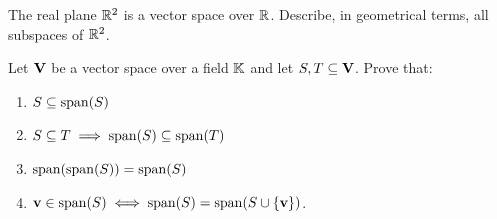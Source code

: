 \begin{exercise}
The real plane $\R^2$ is a vector space over $\R$. Describe, in geometrical terms, all subspaces of
$\R^2$.
\end{exercise}

\begin{exercise}
Let $\V$ be a vector space over a field $\K$ and let $S,T\subseteq \V$. Prove that:
\begin{enumerate}[label=(\alph*)]
\item $S\subseteq \Span{S}$
\item $S\subseteq T \implies \Span{S}\subseteq\Span{T}$
\item $\Span{\Span{S}} = \Span{S}$
\item $\vv\in\Span{S} \iff \Span{S} = \Span{S\cup\{\vv\}}$.
\end{enumerate}
\end{exercise}
